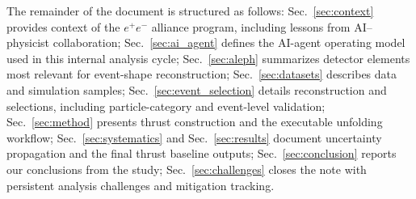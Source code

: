The remainder of the document is structured as follows: Sec.~\ref{sec:context}
provides context of the $e^+e^-$ alliance program, including lessons from AI--physicist collaboration;
Sec.~\ref{sec:ai_agent} defines the AI-agent operating model used in this internal analysis cycle;
Sec.~\ref{sec:aleph} summarizes detector elements most relevant for event-shape
reconstruction; Sec.~\ref{sec:datasets} describes data and simulation samples;
Sec.~\ref{sec:event_selection} details reconstruction and selections, including
particle-category and event-level validation; Sec.~\ref{sec:method} presents
thrust construction and the executable unfolding workflow;
Sec.~\ref{sec:systematics} and Sec.~\ref{sec:results} document uncertainty
propagation and the final thrust baseline outputs; Sec.~\ref{sec:conclusion} reports our conclusions from the study; Sec.~\ref{sec:challenges}
closes the note with persistent analysis challenges and mitigation tracking.
